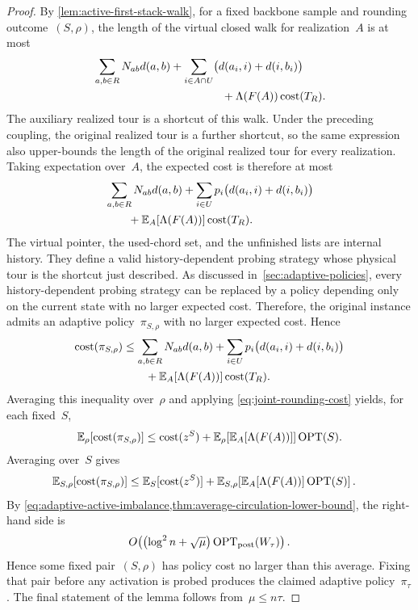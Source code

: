 \documentclass[12pt,a4paper,oneside]{report}
\begin{document}
\begin{proof}
By \cref{lem:active-first-stack-walk}, for a fixed backbone sample and rounding
outcome~$(S,\rho)$,
the length of the virtual closed walk for realization~$A$ is at most
\begin{align*}
    &\sum_{a,b\in R}N_{ab}d(a,b)
      +\sum_{i\in A\cap U}\bigl(d(a_i,i)+d(i,b_i)\bigr)\\
    &\hspace{40mm}
      +\Lambda(F(A))\cost(T_R).
\end{align*}
The auxiliary realized tour is a shortcut of this walk.  Under the preceding
coupling, the original realized tour is a further shortcut, so the same
expression also upper-bounds the length of the original realized tour for
every realization.  Taking
expectation over~$A$, the expected cost is therefore at most
\begin{align*}
    &\sum_{a,b\in R}N_{ab}d(a,b)
      +\sum_{i\in U}p_i\bigl(d(a_i,i)+d(i,b_i)\bigr)\\
    &\qquad
      +\mathbb{E}_A[\Lambda(F(A))]\operatorname{cost}(T_R).
\end{align*}
The virtual pointer, the used-chord set, and the unfinished lists are internal
history.  They define a valid history-dependent probing strategy whose
physical tour is the shortcut just described.  As discussed
in~\cref{sec:adaptive-policies}, every history-dependent probing strategy can
be replaced by a policy depending only on the current state with no larger
expected cost.  Therefore, the original instance admits an adaptive
policy~$\pi_{S,\rho}$ with no larger expected cost.  Hence
\begin{align*}
    \operatorname{cost}(\pi_{S,\rho})
    &\le
      \sum_{a,b\in R}N_{ab}d(a,b)
      +\sum_{i\in U}p_i\bigl(d(a_i,i)+d(i,b_i)\bigr)\\
    &\qquad
      +\mathbb{E}_A[\Lambda(F(A))]\operatorname{cost}(T_R).
\end{align*}
Averaging this inequality over~$\rho$ and applying
\cref{eq:joint-rounding-cost} yields, for each fixed~$S$,
\[
    \mathbb{E}_\rho[\operatorname{cost}(\pi_{S,\rho})]
    \le \operatorname{cost}(z^S)
       +\mathbb{E}_\rho\!\left[\mathbb{E}_A[\Lambda(F(A))]\right]\operatorname{OPT}(S).
\]
Averaging over~$S$ gives
\begin{align*}
    \mathbb{E}_{S,\rho}[\operatorname{cost}(\pi_{S,\rho})]
    &\le \mathbb{E}_S[\operatorname{cost}(z^S)]
      +\mathbb{E}_{S,\rho}\!\left[
         \mathbb{E}_A[\Lambda(F(A))]\operatorname{OPT}(S)
       \right].
\end{align*}
By \cref{eq:adaptive-active-imbalance,thm:average-circulation-lower-bound}, the
right-hand side is
\[
    O\!\left(
      \bigl(\log^2 n+\sqrt\mu\bigr)\operatorname{OPT}_\mathrm{post}(W_\tau)
    \right).
\]
Hence some fixed pair~$(S,\rho)$ has policy
cost no larger than this average.  Fixing that pair before any activation is
probed produces the claimed adaptive policy~$\pi_\tau$.  The final statement
of the lemma follows from~$\mu\le n\tau$.
\end{proof}
\end{document}
